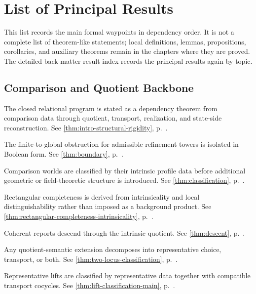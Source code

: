 \chapter*{List of Principal Results}
{}
\label{ch:principal-results-list}
This list records the main formal waypoints in dependency order.  It is
not a complete list of theorem-like statements; local definitions,
lemmas, propositions, corollaries, and auxiliary theorems remain in the
chapters where they are proved.  The detailed back-matter result index
records the principal results again by topic.

\newcommand{\resultloc}[1]{p.~\pageref{#1}}
\newcommand{\resultitem}[3]{%
  \item[#1] #3 See \cref{#2}, \resultloc{#2}.%
}

\section*{Comparison and Quotient Backbone}
\begin{description}[leftmargin=4.8cm,style=nextline,itemsep=0.25em,before=\raggedright]
\resultitem{Structural rigidity}{thm:intro-structural-rigidity}
{The closed relational program is stated as a dependency theorem from
comparison data through quotient, transport, realization, and
state-side reconstruction.}
\resultitem{Quantifier-reversal boundary}{thm:boundary}
{The finite-to-global obstruction for admissible refinement towers is
isolated in Boolean form.}
\resultitem{Comparison-world classification}{thm:classification}
{Comparison worlds are classified by their intrinsic profile data before
additional geometric or field-theoretic structure is introduced.}
\resultitem{Rectangular completeness}{thm:rectangular-completeness-intrinsicality}
{Rectangular completeness is derived from intrinsicality and local
distinguishability rather than imposed as a background product.}
\resultitem{Canonical descent}{thm:descent}
{Coherent reports descend through the intrinsic quotient.}
\resultitem{Two-locus classification}{thm:two-locus-classification}
{Any quotient-semantic extension decomposes into representative choice,
transport, or both.}
\resultitem{Lift classification}{thm:lift-classification-main}
{Representative lifts are classified by representative data together
with compatible transport cocycles.}
\end{description}

